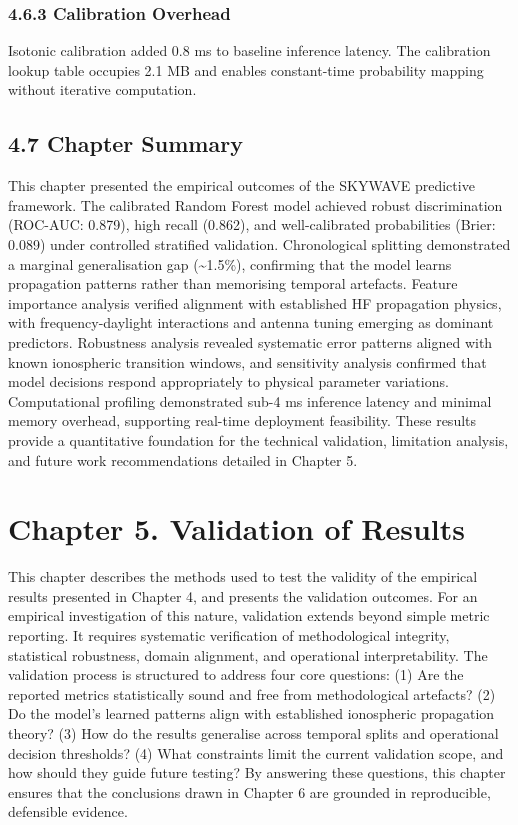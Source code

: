 \subsubsection{4.6.3 Calibration Overhead}\label{calibration-overhead}

Isotonic calibration added 0.8 ms to baseline inference latency. The
calibration lookup table occupies 2.1 MB and enables constant-time
probability mapping without iterative computation.

\subsection{4.7 Chapter Summary}\label{chapter-summary}

This chapter presented the empirical outcomes of the SKYWAVE predictive
framework. The calibrated Random Forest model achieved robust
discrimination (ROC-AUC: 0.879), high recall (0.862), and
well-calibrated probabilities (Brier: 0.089) under controlled stratified
validation. Chronological splitting demonstrated a marginal
generalisation gap (\textasciitilde1.5\%), confirming that the model
learns propagation patterns rather than memorising temporal artefacts.
Feature importance analysis verified alignment with established HF
propagation physics, with frequency-daylight interactions and antenna
tuning emerging as dominant predictors. Robustness analysis revealed
systematic error patterns aligned with known ionospheric transition
windows, and sensitivity analysis confirmed that model decisions respond
appropriately to physical parameter variations. Computational profiling
demonstrated sub-4 ms inference latency and minimal memory overhead,
supporting real-time deployment feasibility. These results provide a
quantitative foundation for the technical validation, limitation
analysis, and future work recommendations detailed in Chapter 5.

\section{Chapter 5. Validation of
Results}\label{chapter-5.-validation-of-results}

This chapter describes the methods used to test the validity of the
empirical results presented in Chapter 4, and presents the validation
outcomes. For an empirical investigation of this nature, validation
extends beyond simple metric reporting. It requires systematic
verification of methodological integrity, statistical robustness, domain
alignment, and operational interpretability. The validation process is
structured to address four core questions: (1) Are the reported metrics
statistically sound and free from methodological artefacts? (2) Do the
model's learned patterns align with established ionospheric propagation
theory? (3) How do the results generalise across temporal splits and
operational decision thresholds? (4) What constraints limit the current
validation scope, and how should they guide future testing? By answering
these questions, this chapter ensures that the conclusions drawn in
Chapter 6 are grounded in reproducible, defensible evidence.

